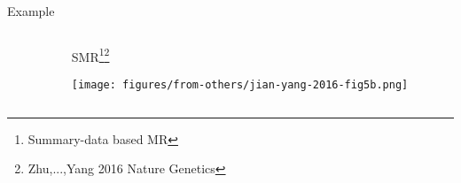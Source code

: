 \documentclass{beamer}
\begin{document}
\begin{frame}{Example}
\begin{columns}[t]
\begin{column}{0.5\textwidth}

\end{column}

\begin{column}{0.5\textwidth}
\begin{center}
SMR\footnote{Summary-data based MR}\footnote{Zhu,...,Yang 2016 Nature Genetics}
\end{center}

\texttt{[image: figures/from-others/jian-yang-2016-fig5b.png]}
\end{column}
\end{columns}
\end{frame}
\end{document}
